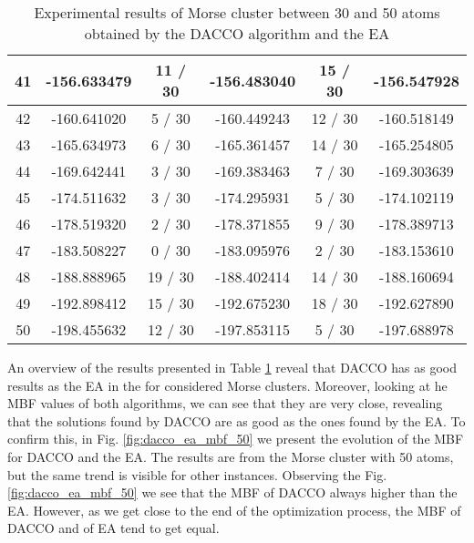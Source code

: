 \begin{table}[!htdp]
\begin{center}
\begin{tabular}{| c | c | c | c | c | c |}
						41 & -156.633479 & 11 / 30 & -156.483040 & 15 / 30 & -156.547928 \\ \hline
						42 & -160.641020 & 5 / 30 & -160.449243 & 12 / 30 & -160.518149 \\ \hline
						43 & -165.634973 & 6 / 30 & -165.361457 & 14 / 30 & -165.254805 \\ \hline
						44 & -169.642441 & 3 / 30 & -169.383463 & 7 / 30 & -169.303639 \\ \hline
						45 & -174.511632 & 3 / 30 & -174.295931 & 5 / 30 & -174.102119 \\ \hline
						46 & -178.519320 & 2 / 30 & -178.371855 & 9 / 30 & -178.389713 \\ \hline
						47 & -183.508227 & 0 / 30 & -183.095976 & 2 / 30 & -183.153610 \\ \hline
						48 & -188.888965 & 19 / 30 & -188.402414 & 14 / 30 & -188.160694 \\ \hline
						49 & -192.898412 & 15 / 30 & -192.675230 & 18 / 30 & -192.627890 \\ \hline
						50 & -198.455632 & 12 / 30 & -197.853115 & 5 / 30 & -197.688978 \\ \hline
					\end{tabular}
				\end{center}
				\caption{Experimental results of Morse cluster between 30 and 50 atoms obtained by the DACCO algorithm and the EA}
				\label{tab:dacco_vs_ea}
			\end{table}
			
			An overview of the results presented in Table \ref{tab:dacco_vs_ea} reveal that DACCO has as good results as the EA in the for considered Morse clusters. Moreover, looking at he MBF values of both algorithms, we can see that they are very close, revealing that the solutions found by DACCO are as good as the ones found by the EA. To confirm this, in Fig. \ref{fig:dacco_ea_mbf_50} we present the evolution of the MBF for DACCO and the EA. The results are from the Morse cluster with 50 atoms, but the same trend is visible for other instances. 
			Observing the Fig. \ref{fig:dacco_ea_mbf_50} we see that the MBF of DACCO always higher than the EA. However, as we get close to the end of the optimization process, the MBF of DACCO and of EA tend to get equal.
			
